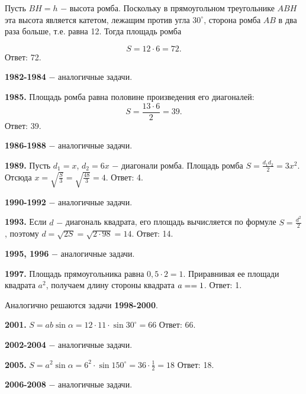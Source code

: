 Пусть $BH = h$ $-$ высота ромба. Поскольку в прямоугольном треугольнике $ABH$ эта высота является катетом, лежащим против угла $30^\circ$, сторона ромба $AB$ в два раза больше, т.е. равна 12. Тогда площадь ромба

\[
S = 12 \cdot 6 = 72.
\]
\null \hspace*{\fill} Ответ: 72.

\textbf{1982-1984} $-$ аналогичные задачи.

\textbf{1985.} Площадь ромба равна половине произведения его диагоналей:
\[
S = \frac{13\cdot6}{2}=39.
\]
\null \hspace*{\fill} Ответ: 39.

\textbf{1986-1988} $-$ аналогичные задачи.

\textbf{1989.} Пусть $d_1=x$, $d_2=6x$ $-$ диагонали ромба. Площадь ромба $S = \frac{d_1d_2}{2}=3x^2$. Отсюда $x = \sqrt{\frac{S}{3}} = \sqrt{\frac{48}{3}}=4$. \newline \null \hspace*{\fill} Ответ: 4.

\textbf{1990-1992} $-$ аналогичные задачи.

\textbf{1993.}  Если $d$ $-$ диагональ квадрата, его площадь вычисляется по формуле $S = \frac{d^2}{2}$, поэтому $d = \sqrt{2S} = \sqrt{2\cdot98}=14.$ \newline \null \hspace*{\fill} Ответ: 14.

\textbf{1995, 1996} $-$ аналогичные задачи.

\textbf{1997.} Площадь прямоугольника равна $0,5\cdot2=1$.  Приравнивая ее площади квадрата $a^2$, получаем длину стороны квадрата $a=\linebreak=1$.
\newline \null \hspace*{\fill} Ответ: 1.

Аналогично решаются задачи \textbf{1998-2000}.

\textbf{2001.} $S = ab\sin{\alpha}=12\cdot11\cdot\sin{30^\circ}=66$ \newline \null \hspace*{\fill} Ответ: 66.

\textbf{2002-2004} $-$ аналогичные задачи.

\textbf{2005.} $S = a^2\sin{\alpha}=6^2\cdot\sin{150^\circ}=36\cdot\frac{1}{2}=18$ \newline \null \hspace*{\fill} Ответ: 18.

\textbf{2006-2008} $-$ аналогичные задачи.

